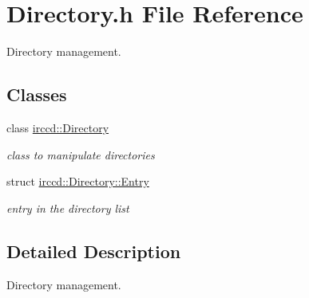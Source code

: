 \hypertarget{a00075}{\section{Directory.\-h File Reference}
\label{a00075}
}


Directory management.  


\subsection*{Classes}
\begin{DoxyCompactItemize}
\item 
class \hyperlink{a00025}{irccd\-::\-Directory}
\begin{DoxyCompactList}\small\item\em class to manipulate directories \end{DoxyCompactList}\item 
struct \hyperlink{a00026}{irccd\-::\-Directory\-::\-Entry}
\begin{DoxyCompactList}\small\item\em entry in the directory list \end{DoxyCompactList}\end{DoxyCompactItemize}


\subsection{Detailed Description}
Directory management. 